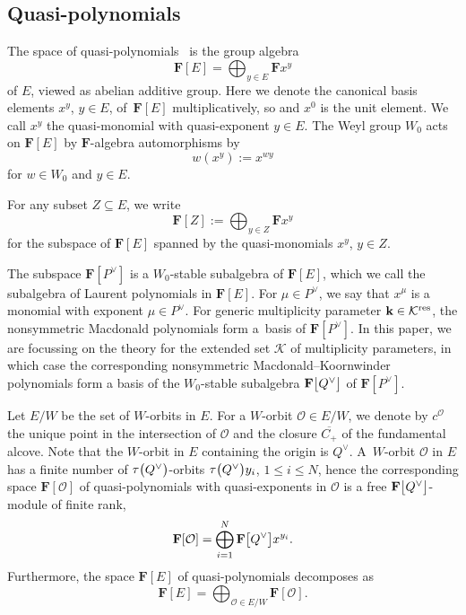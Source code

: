 \subsection{Quasi-polynomials}%
The space of quasi-polynomials~\cite{SSV2} is the group algebra
\[
\mathbf{F}[E]=\bigoplus_{y\in E}\mathbf{F}x^y
\]
of $E$, viewed as abelian additive group. Here we denote the canonical basis elements $x^y$, ${y\in E}$, of~$\mathbf{F}[E]$ multiplicatively, so  and $x^0$ is the unit element. We call $x^y$ the quasi-monomial with quasi-exponent $y\in E$. The Weyl group $W_0$ acts on $\mathbf{F}[E]$
by $\mathbf{F}$-algebra automorphisms by
\[
w(x^y):=x^{wy}
\]
for $w\in W_0$ and $y\in E$.

For any subset $Z\subseteq E$, we write
\[
\mathbf{F}[Z]:=\bigoplus_{y\in Z}\mathbf{F}x^y
\]
for the subspace of $\mathbf{F}[E]$ spanned by the quasi-monomials $x^y$, $y\in Z$.

The subspace $\mathbf{F}[P^\vee]$ is a $W_0$-stable subalgebra of $\mathbf{F}[E]$, which we call the subalgebra of Laurent polynomials in $\mathbf{F}[E]$. For $\mu\in P^\vee$, we say that $x^\mu$ is a monomial with exponent $\mu\in P^\vee$.
For generic multiplicity parameter $\mathbf{k}\in\mathcal{K}^{{\rm res}}$, the nonsymmetric Macdonald polynomials form a~basis of $\mathbf{F}[P^\vee]$.
In this paper, we are focussing on the theory for the extended set $\mathcal{K}$ of multiplicity parameters, in which case the corresponding nonsymmetric Macdonald--Koornwinder polynomials form a basis of the $W_0$-stable subalgebra $\mathbf{F}\smash{\bigl[Q^\vee\bigr]}$ of $\mathbf{F}[P^\vee]$.

Let $E/W$ be the set of $W$-orbits in $E$. For a $W$-orbit $\mathcal{O}\in E/W$, we denote by $c^{\mathcal{O}}$ the unique point in the intersection of $\mathcal{O}$
and the closure $\overline{C_+}$ of the fundamental alcove. Note that the $W$-orbit in $E$ containing the origin is $Q^\vee$.
A~$W$-orbit $\mathcal{O}$ in $E$ has a finite number of $\tau\smash{\bigl(Q^\vee\bigr)}$-orbits $\tau\smash{\bigl(Q^\vee\bigr)}y_i$, $1\leq i\leq N$, hence the corresponding space $\mathbf{F}[\mathcal{O}]$ of quasi-polynomials with quasi-exponents in $\mathcal{O}$ is a free $\mathbf{F}\smash{\bigl[Q^\vee\bigr]}$-module of finite rank,
\begin{equation}\label{FOpoldec}
\mathbf{F}[\mathcal{O}]=\bigoplus_{i=1}^N\mathbf{F}\smash{\bigl[Q^\vee\bigr]}x^{y_i}.
\end{equation}
Furthermore, the
space $\mathbf{F}[E]$ of quasi-polynomials decomposes as
\begin{equation}\label{Porbit}
\mathbf{F}[E]=\bigoplus_{\mathcal{O}\in E/W}\mathbf{F}[\mathcal{O}].
\end{equation}

